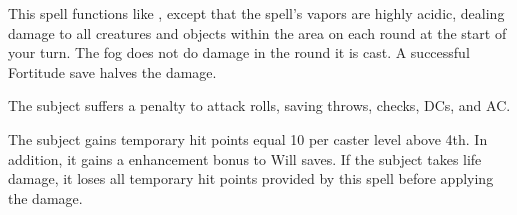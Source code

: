 \spellrng{\rngmed}
\spelldur{\durshort}
\begin{spelleffect}
  This spell functions like , except that the spell's vapors are highly acidic, dealing damage to all creatures and objects within the area on each round at the start of your turn. The fog does not do damage in the round it is cast. A successful Fortitude save halves the damage.
\end{spelleffect}

\spellrng{\rngclose}
\begin{spelleffect}
  The subject suffers a  penalty to attack rolls, saving throws, checks, DCs, and AC.
\end{spelleffect}

\spellrng{\rngclose}
\spelldur{\durshort}
\begin{spelleffect}
  The subject gains temporary hit points equal 10  per caster level above 4th. In addition, it gains a  enhancement bonus to Will saves. \bonusscalingdescription  If the subject takes life damage, it loses all temporary hit points provided by this spell before applying the damage.
\end{spelleffect}

